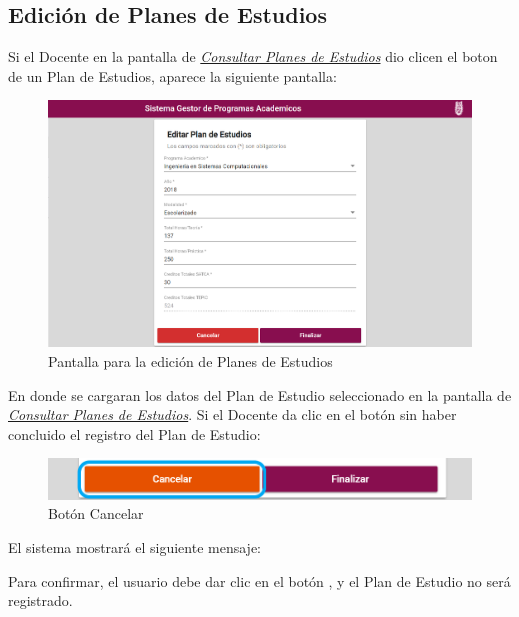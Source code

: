 \subsection{Edición de Planes de Estudios}
Si el  Docente en la pantalla de \hyperlink{consultarPE}{\textit{Consultar Planes de Estudios}} dio clicen el boton  de un Plan de Estudios, aparece la siguiente pantalla:

\begin{figure}[!hbtp]
	\centering
	\hypertarget{editarPE}{\includegraphics[width=0.7\linewidth]{images/SP4-GPE/editarPE}}
	\caption{Pantalla para la edición de Planes de Estudios}
	\label{editarPE}
\end{figure}
En donde se cargaran los datos del Plan de Estudio seleccionado en la pantalla de \hyperlink{consultarPE}{\textit{Consultar Planes de Estudios}}.
Si el Docente  da clic en el botón  sin haber concluido el registro del Plan de Estudio:

\begin{figure}[!hbtp]
	\centering
	\hypertarget{cancel2}{\includegraphics[width=0.7\linewidth]{images/SP4-GPE/cancelarPE}}
	\caption{Botón Cancelar}
	\label{cancel2}
\end{figure}

El sistema mostrará el siguiente mensaje:

Para confirmar, el usuario debe dar clic en el botón  , y el Plan de Estudio no será registrado.\\

